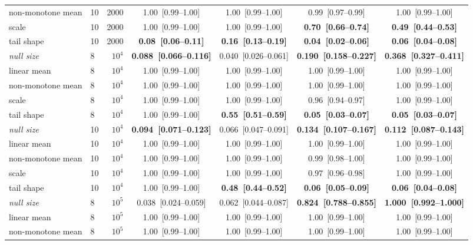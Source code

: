 \begin{table}[p]
{\begin{tabular}{llrcccc}
non-monotone mean & 10 & 2000 & 1.00~[0.99--1.00] & 1.00~[0.99--1.00] & 0.99~[0.97--0.99] & 1.00~[0.99--1.00] \\
scale & 10 & 2000 & 1.00~[0.99--1.00] & 1.00~[0.99--1.00] & \textbf{0.70~[0.66--0.74]} & \textbf{0.49~[0.44--0.53]} \\
tail shape & 10 & 2000 & \textbf{0.08~[0.06--0.11]} & \textbf{0.16~[0.13--0.19]} & \textbf{0.04~[0.02--0.06]} & \textbf{0.06~[0.04--0.08]} \\
\midrule
\emph{null size} & 8 & $10^4$ & \textbf{0.088~[0.066--0.116]} & 0.040~[0.026--0.061] & \textbf{0.190~[0.158--0.227]} & \textbf{0.368~[0.327--0.411]} \\
linear mean & 8 & $10^4$ & 1.00~[0.99--1.00] & 1.00~[0.99--1.00] & 1.00~[0.99--1.00] & 1.00~[0.99--1.00] \\
non-monotone mean & 8 & $10^4$ & 1.00~[0.99--1.00] & 1.00~[0.99--1.00] & 1.00~[0.99--1.00] & 1.00~[0.99--1.00] \\
scale & 8 & $10^4$ & 1.00~[0.99--1.00] & 1.00~[0.99--1.00] & 0.96~[0.94--0.97] & 1.00~[0.99--1.00] \\
tail shape & 8 & $10^4$ & 1.00~[0.99--1.00] & \textbf{0.55~[0.51--0.59]} & \textbf{0.05~[0.03--0.07]} & \textbf{0.05~[0.03--0.07]} \\
\midrule
\emph{null size} & 10 & $10^4$ & \textbf{0.094~[0.071--0.123]} & 0.066~[0.047--0.091] & \textbf{0.134~[0.107--0.167]} & \textbf{0.112~[0.087--0.143]} \\
linear mean & 10 & $10^4$ & 1.00~[0.99--1.00] & 1.00~[0.99--1.00] & 1.00~[0.99--1.00] & 1.00~[0.99--1.00] \\
non-monotone mean & 10 & $10^4$ & 1.00~[0.99--1.00] & 1.00~[0.99--1.00] & 0.99~[0.98--1.00] & 1.00~[0.99--1.00] \\
scale & 10 & $10^4$ & 1.00~[0.99--1.00] & 1.00~[0.99--1.00] & 0.97~[0.96--0.98] & 1.00~[0.99--1.00] \\
tail shape & 10 & $10^4$ & 1.00~[0.99--1.00] & \textbf{0.48~[0.44--0.52]} & \textbf{0.06~[0.05--0.09]} & \textbf{0.06~[0.04--0.08]} \\
\midrule
\emph{null size} & 8 & $10^5$ & 0.038~[0.024--0.059] & 0.062~[0.044--0.087] & \textbf{0.824~[0.788--0.855]} & \textbf{1.000~[0.992--1.000]} \\
linear mean & 8 & $10^5$ & 1.00~[0.99--1.00] & 1.00~[0.99--1.00] & 1.00~[0.99--1.00] & 1.00~[0.99--1.00] \\
non-monotone mean & 8 & $10^5$ & 1.00~[0.99--1.00] & 1.00~[0.99--1.00] & 1.00~[0.99--1.00] & 1.00~[0.99--1.00] \\

\end{tabular}}
\end{table}
